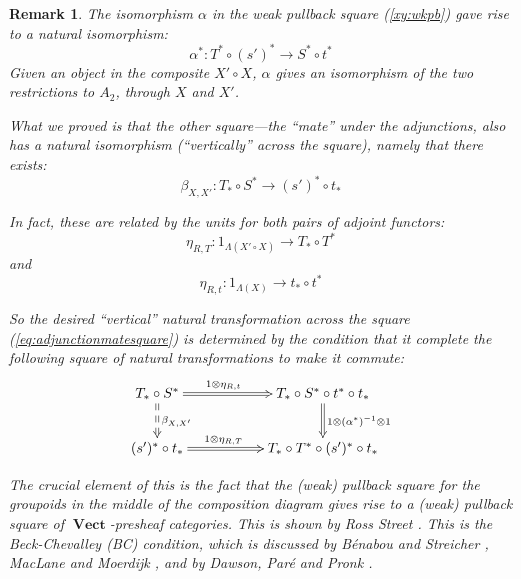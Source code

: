 \documentclass[10pt]{amsart}
\numberwithin{theorem}{subsection}
\newtheorem{varremark}[theorem]{Remark}
\newenvironment{remark}{\begin{varremark}\em}{\em\end{varremark}}
\newcommand{\ra}{\mathop{\rightarrow}}
\newcommand{\opname}[1]{\operatorname{#1}}
\newcommand{\catname}[1]{\boldsymbol{\opname{{#1}}}}
\newcommand{\V}{\catname{Vect}}
\newcommand{\FV}{\Lambda}
\begin{document}
\begin{remark} The isomorphism $\alpha$ in the weak pullback square
(\ref{xy:wkpb}) gave rise to a natural isomorphism:
\begin{equation}
\alpha^{\ast} :  T^{\ast} \circ  (s')^{\ast}   \ra  S^{\ast} \circ t^{\ast}
\end{equation}
Given an object in the composite $X' \circ X$, $\alpha$
gives an isomorphism of the two restrictions to $A_2$, through $X$ and $X'$.

What we proved is that the other square---the ``mate'' under the
adjunctions, also has a natural isomorphism (``vertically'' across the
square), namely that there exists:
\begin{equation}
\beta_{X,X'} : T_{\ast} \circ S^{\ast} \ra (s')^{\ast} \circ t_{\ast}
\end{equation}

In fact, these are related by the units for both pairs of adjoint functors:
\begin{equation}
\eta_{R,T} : 1_{\FV(X'\circ X)} \ra  T_{\ast} \circ T^{\ast}
\end{equation}
and
\begin{equation}
\eta_{R,t} : 1_{\FV(X)} \ra  t_{\ast} \circ t^{\ast}
\end{equation}

So the desired ``vertical'' natural transformation across the square
(\ref{eq:adjunctionmatesquare}) is determined  by the condition that it complete the following
square of natural transformations to make it commute:
\begin{equation}\label{eq:nearlybeck2}
\xymatrix{
T_{\ast} \circ S^{\ast} \ar@{=>}[rr]^(.4){1 \otimes \eta_{R,t}} \ar@{==>}[d]^{\beta_{X,X'}} & & T_{\ast} \circ S^{\ast} \circ t^{\ast} \circ t_{\ast} \ar@{=>}[d]^{1 \otimes (\alpha^{\ast})^{-1} \otimes 1} \\ 
(s')^{\ast} \circ t_{\ast} \ar@{=>}[rr]^(.4){1 \otimes \eta_{R,T}} & & T_{\ast} \circ T^{\ast} \circ (s')^{\ast} \circ t_{\ast} \\ 
}
\end{equation}

The crucial element of this is the fact that the (weak) pullback
square for the groupoids in the middle of the composition diagram
gives rise to a (weak) pullback square of $\V$-presheaf categories.
This is shown by Ross Street \cite{street2}.  This is the
\textit{Beck-Chevalley} (BC) condition, which is discussed by
B\'enabou and Streicher \cite{BCES}, MacLane and Moerdijk
\cite{macmoer}, and by Dawson, Par\'e and Pronk
\cite{unispan}.
\end{remark}


\end{document}

